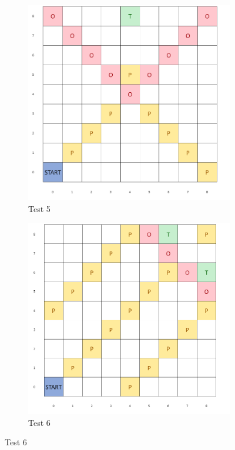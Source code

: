 \documentclass{article}
\begin{document}
\begin{appendices}
\begin{figure}[H]
   	 \centering
     \begin{subfigure}[b]{0.45\textwidth}
         \centering
         \includegraphics[width=\textwidth]{images/test5.png}
         \caption{Test 5}
         \label{fig:test15}
     \end{subfigure}
     \hfill
     \begin{subfigure}[b]{0.45\textwidth}
         \centering
         \includegraphics[width=\textwidth]{images/test6.png}
         \caption{Test 6}
         \label{fig:test16}
     \end{subfigure}
\end{figure}


\end{appendices}
\end{document}
